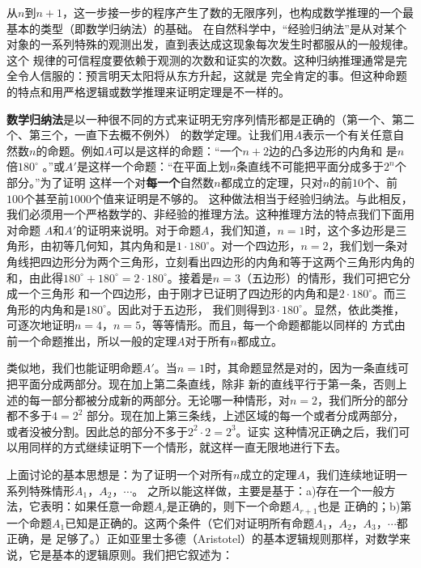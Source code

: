 从$n$到$n+1$，这一步接一步的程序产生了数的无限序列，也构成数学推理的一个最基本的类型（即数学归纳法）的基础。
在自然科学中，“经验归纳法”是从对某个对象的一系列特殊的观测出发，直到表达成这现象每次发生时都服从的一般规律。这个
规律的可信程度要依赖于观测的次数和证实的次数。这种归纳推理通常是完全令人信服的：预言明天太阳将从东方升起，这就是
完全肯定的事。但这种命题的特点和用严格逻辑或数学推理来证明定理是不一样的。

\textbf{数学归纳法}是以一种很不同的方式来证明无穷序列情形都是正确的（第一个、第二个、第三个，一直下去概不例外）
的数学定理。让我们用$A$表示一个有关任意自然数$n$的命题。例如$A$可以是这样的命题：“一个$n+2$边的凸多边形的内角和
是$n$倍$180^\circ$ 。”或$A'$是这样一个命题：“在平面上划$n$条直线不可能把平面分成多于$2^n$个部分。”为了证明
这样一个对\textbf{每一个}自然数$n$都成立的定理，只对$n$的前$10$个、前$100$个甚至前$1000$个值来证明是不够的。
这种做法相当于经验归纳法。与此相反，我们必须用一个严格数学的、非经验的推理方法。这种推理方法的特点我们下面用对命题
$A$和$A'$的证明来说明。对于命题$A$，我们知道，$n=1$时，这个多边形是三角形，由初等几何知，其内角和是$1\cdot 180^\circ$。对一个四边形，$n=2$，我们划一条对角线把四边形分为两个三角形，立刻看出四边形的内角和等于这两个三角形内角的
和，由此得$180^\circ + 180^\circ = 2\cdot 180^\circ$。接着是$n=3$（五边形）的情形，我们可把它分成一个三角形
和一个四边形，由于刚才已证明了四边形的内角和是$2\cdot 180^\circ$。而三角形的内角和是$180^\circ$。因此对于五边形，
我们则得到$3\cdot 180^\circ$。显然，依此类推，可逐次地证明$n=4$，$n=5$，等等情形。而且，每一个命题都能以同样的
方式由前一个命题推出，所以一般的定理$A$对于所有$n$都成立。

类似地，我们也能证明命题$A'$。当$n=1$时，其命题显然是对的，因为一条直线可把平面分成两部分。现在加上第二条直线，除非
新的直线平行于第一条，否则上述的每一部分都被分成新的两部分。无论哪一种情形，对$n=2$，我们所分的部分都不多于$4=2^2$
部分。现在加上第三条线，上述区域的每一个或者分成两部分，或者没被分割。因此总的部分不多于$2^2\cdot 2 = 2^3$。证实
这种情况正确之后，我们可以用同样的方式继续证明下一个情形，就这样一直无限地进行下去。

上面讨论的基本思想是：为了证明一个对所有$n$成立的定理$A$，我们连续地证明一系列特殊情形$A_1$，$A_2$，$\cdots$。
之所以能这样做，主要是基于：a)存在一个一般方法，它表明：如果任意一命题$A_r$是正确的，则下一个命题$A_{r+1}$也是
正确的；b)第一个命题$A_1$已知是正确的。这两个条件（它们对证明所有命题$A_1$，$A_2$，$A_3$，$\cdots$都正确，是
足够了。）正如亚里士多德（Aristotel）的基本逻辑规则那样，对数学来说，它是基本的逻辑原则。我们把它叙述为：

